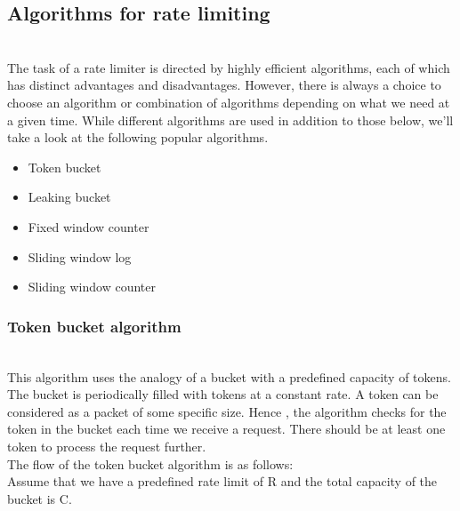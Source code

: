 

\subsection{Algorithms for rate limiting}\label{DaVuByHkKpJOEyUdmyU5g}
\\
The task of a rate limiter is directed by highly efficient algorithms, each of which has distinct advantages and disadvantages. However, there is always a choice to choose an algorithm or combination of algorithms depending on what we need at a given time. While different algorithms are used in addition to those below, we'll take a look at the following popular algorithms.

\begin{itemize}
\item
\protect{}\label{OHUB-zXnSNRLqbDJe35_2}
Token bucket
\item
\protect{}\label{Tfyly-58W51zuahc6cZaC}
Leaking bucket
\item
\protect{}\label{CfzcXfvLHk0ZbWGzkCu_M}
Fixed window counter
\item
\protect{}\label{U90Q4DX71zwvTBdDXfKGw}
Sliding window log
\item
\protect{}\label{plnwk1Y8bNxl1HceQPff-}
Sliding window counter
\end{itemize}

\subsubsection{Token bucket algorithm}\label{KPVCOyQb7_Nhfk0nBISsB}
\\
This algorithm uses the analogy of a bucket with a predefined capacity of tokens. The bucket is periodically filled with tokens at a constant rate. A token can be considered as a packet of some specific size. Hence , the algorithm checks for the token in the bucket each time we receive a request. There should be at least one token to process the request further.
\\
The flow of the token bucket algorithm is as follows:
\\
Assume that we have a predefined rate limit of \protect{}\label{katex_inline_6id3VgfRGpUqUSgvYZxDp}{{{\(\text{R}\)}}} and the total capacity of the bucket is \protect{}\label{katex_inline_HIxbcGzVePpKk2IV9yPvA}{{{\(\text{C}\)}}}.


